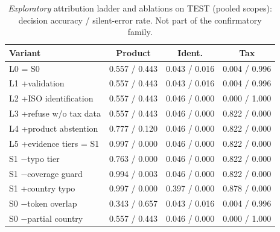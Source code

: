\begin{table}[t]
\centering
\caption{\emph{Exploratory} attribution ladder and ablations on TEST (pooled scopes): decision accuracy / silent-error rate. Not part of the confirmatory family.}
\label{tab:ladder}
\footnotesize
\setlength{\tabcolsep}{3pt}
\begin{tabular}{@{}lccc@{}}
\toprule
Variant & Product & Ident. & Tax \\
\midrule
L0 = S0 & 0.557 / 0.443 & 0.043 / 0.016 & 0.004 / 0.996 \\
L1 +validation & 0.557 / 0.443 & 0.043 / 0.016 & 0.004 / 0.996 \\
L2 +ISO identification & 0.557 / 0.443 & 0.046 / 0.000 & 0.000 / 1.000 \\
L3 +refuse w/o tax data & 0.557 / 0.443 & 0.046 / 0.000 & 0.822 / 0.000 \\
L4 +product abstention & 0.777 / 0.120 & 0.046 / 0.000 & 0.822 / 0.000 \\
L5 +evidence tiers = S1 & 0.997 / 0.000 & 0.046 / 0.000 & 0.822 / 0.000 \\
\midrule
S1 $-$typo tier & 0.763 / 0.000 & 0.046 / 0.000 & 0.822 / 0.000 \\
S1 $-$coverage guard & 0.994 / 0.003 & 0.046 / 0.000 & 0.822 / 0.000 \\
S1 +country typo & 0.997 / 0.000 & 0.397 / 0.000 & 0.878 / 0.000 \\
S0 $-$token overlap & 0.343 / 0.657 & 0.043 / 0.016 & 0.004 / 0.996 \\
S0 $-$partial country & 0.557 / 0.443 & 0.046 / 0.000 & 0.000 / 1.000 \\
\bottomrule
\end{tabular}
\end{table}
